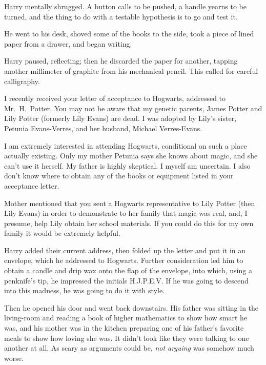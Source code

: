 Harry mentally shrugged. A button calls to be pushed, a handle yearns to be turned, and the thing to do with a testable hypothesis is to go and test it.

He went to his desk, shoved some of the books to the side, took a piece of lined paper from a drawer, and began writing.

\begin{writtenNote}
\end{writtenNote}

Harry paused, reflecting; then he discarded the paper for another, tapping another millimeter of graphite from his mechanical pencil. This called for careful calligraphy.

\begin{writtenNote}


I recently received your letter of acceptance to Hogwarts, addressed to Mr.~H.~Potter. You may not be aware that my genetic parents, James Potter and Lily Potter (formerly Lily Evans) are dead. I was adopted by Lily's sister, Petunia Evans-Verres, and her husband, Michael Verres-Evans.

I am extremely interested in attending Hogwarts, conditional on such a place actually existing. Only my mother Petunia says she knows about magic, and she can't use it herself. My father is highly skeptical. I myself am uncertain. I also don't know where to obtain any of the books or equipment listed in your acceptance letter.

Mother mentioned that you sent a Hogwarts representative to Lily Potter (then Lily Evans) in order to demonstrate to her family that magic was real, and, I presume, help Lily obtain her school materials. If you could do this for my own family it would be extremely helpful.

\end{writtenNote}

Harry added their current address, then folded up the letter and put it in an envelope, which he addressed to Hogwarts. Further consideration led him to obtain a candle and drip wax onto the flap of the envelope, into which, using a penknife's tip, he impressed the initials H.J.P.E.V\@. If he was going to descend into this madness, he was going to do it with style.

Then he opened his door and went back downstairs. His father was sitting in the living-room and reading a book of higher mathematics to show how smart he was, and his mother was in the kitchen preparing one of his father's favorite meals to show how loving she was. It didn't look like they were talking to one another at all. As scary as arguments could be, \emph{not arguing} was somehow much worse.

